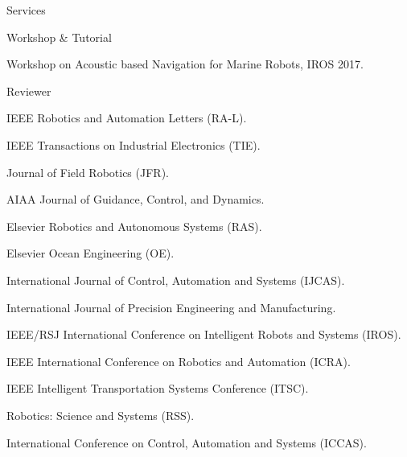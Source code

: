 \begin{rSection}{Services}
\begin{rSubsection}{Workshop \& Tutorial}{}{}{}
  \item Workshop on Acoustic based Navigation for Marine Robots, IROS 2017.
\end{rSubsection}

\begin{rSubsection}{Reviewer}{}{}{}
  \item IEEE Robotics and Automation Letters (RA-L).
  \item IEEE Transactions on Industrial Electronics (TIE).
  \item Journal of Field Robotics (JFR).
  \item AIAA Journal of Guidance, Control, and Dynamics.
  \item Elsevier Robotics and Autonomous Systems (RAS).
  \item Elsevier Ocean Engineering (OE).
  \item International Journal of Control, Automation and Systems (IJCAS).
  \item International Journal of Precision Engineering and Manufacturing.
  \item IEEE/RSJ International Conference on Intelligent Robots and Systems (IROS).
  \item IEEE International Conference on Robotics and Automation (ICRA).
  \item IEEE Intelligent Transportation Systems Conference (ITSC).
  \item Robotics: Science and Systems (RSS).
  \item International Conference on Control, Automation and Systems (ICCAS).
\end{rSubsection}


\end{rSection}
